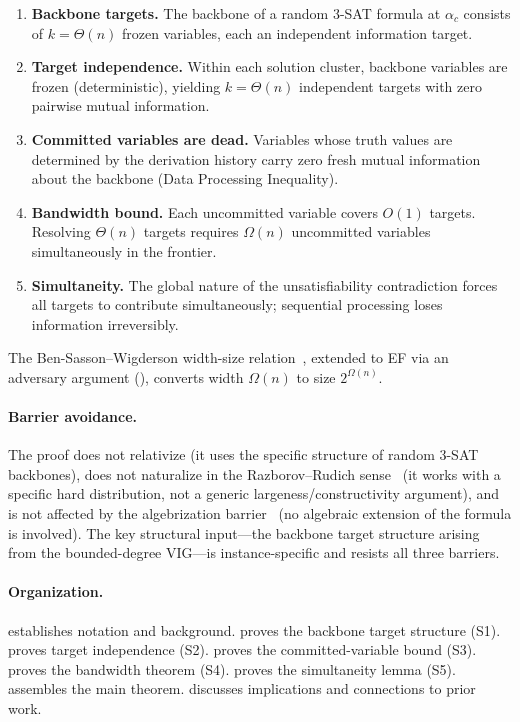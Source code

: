 \documentclass[11pt]{article}
\theoremstyle{definition}
\begin{document}
\begin{enumerate}[label=\textbf{S\arabic*}]
\item \textbf{Backbone targets.} The backbone of a random 3-SAT formula
at $\alpha_c$ consists of $k = \Theta(n)$ frozen variables, each an
independent information target.

\item \textbf{Target independence.} Within each solution cluster, backbone
variables are frozen (deterministic), yielding $k = \Theta(n)$
independent targets with zero pairwise mutual information.

\item \textbf{Committed variables are dead.} Variables whose truth values
are determined by the derivation history carry zero fresh mutual
information about the backbone (Data Processing Inequality).

\item \textbf{Bandwidth bound.} Each uncommitted variable covers $O(1)$
targets.  Resolving $\Theta(n)$ targets requires $\Omega(n)$ uncommitted
variables simultaneously in the frontier.

\item \textbf{Simultaneity.} The global nature of the unsatisfiability
contradiction forces all targets to contribute simultaneously; sequential
processing loses information irreversibly.
\end{enumerate}

The Ben-Sasson--Wigderson width-size relation~\cite{BenSasson2001},
extended to EF via an adversary argument (), converts
width $\Omega(n)$ to size $2^{\Omega(n)}$.

\paragraph{Barrier avoidance.}
The proof does not relativize (it uses the specific structure of random
3-SAT backbones), does not naturalize in the Razborov--Rudich
sense~\cite{RazborovRudich1997} (it works with a specific hard
distribution, not a generic largeness/constructivity argument), and is
not affected by the algebrization barrier~\cite{AaronsonWigderson2009}
(no algebraic extension of the formula is involved).  The key structural
input---the backbone target structure arising from the bounded-degree
VIG---is instance-specific and resists all three barriers.

\paragraph{Organization.}
 establishes notation and background.
 proves the backbone target structure (S1).
 proves target independence (S2).
 proves the committed-variable bound (S3).
 proves the bandwidth theorem (S4).
 proves the simultaneity lemma (S5).
 assembles the main theorem.
 discusses implications and connections to prior
work.
\end{document}
